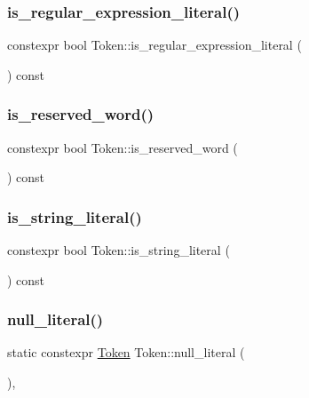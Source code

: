 \subsubsection{\texorpdfstring{is\+\_\+regular\+\_\+expression\+\_\+literal()}{is\_regular\_expression\_literal()}}
{\footnotesize\ttfamily constexpr bool Token\+::is\+\_\+regular\+\_\+expression\+\_\+literal (\begin{DoxyParamCaption}{ }\end{DoxyParamCaption}) const\hspace{0.3cm}{\ttfamily [inline]}}

\mbox{\label{class_token_ae87de0ad9832e1799e0ea15179b6abb5}} 
\subsubsection{\texorpdfstring{is\+\_\+reserved\+\_\+word()}{is\_reserved\_word()}}
{\footnotesize\ttfamily constexpr bool Token\+::is\+\_\+reserved\+\_\+word (\begin{DoxyParamCaption}{ }\end{DoxyParamCaption}) const\hspace{0.3cm}{\ttfamily [inline]}}

\mbox{\label{class_token_a177fc1cf8c4956570fbe74e3b93507b5}} 
\subsubsection{\texorpdfstring{is\+\_\+string\+\_\+literal()}{is\_string\_literal()}}
{\footnotesize\ttfamily constexpr bool Token\+::is\+\_\+string\+\_\+literal (\begin{DoxyParamCaption}{ }\end{DoxyParamCaption}) const\hspace{0.3cm}{\ttfamily [inline]}}

\mbox{\label{class_token_af892768a64f034c6d941281fd7d6b758}} 
\subsubsection{\texorpdfstring{null\+\_\+literal()}{null\_literal()}}
{\footnotesize\ttfamily static constexpr \hyperlink{class_token}{Token} Token\+::null\+\_\+literal (\begin{DoxyParamCaption}{ }\end{DoxyParamCaption})\hspace{0.3cm}{\ttfamily [inline]}, {\ttfamily [static]}}

